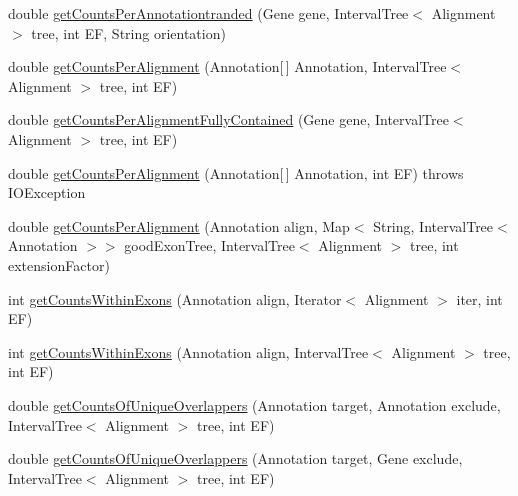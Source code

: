 \begin{DoxyCompactItemize}
\item 
double \hyperlink{interfacebroad_1_1pda_1_1seq_1_1segmentation_1_1_alignment_data_model_a0be22f281d5cabb81da650083813ea30}{get\+Counts\+Per\+Annotationtranded} (Gene gene, Interval\+Tree$<$ Alignment $>$ tree, int E\+F, String orientation)
\item 
double \hyperlink{interfacebroad_1_1pda_1_1seq_1_1segmentation_1_1_alignment_data_model_a1ed3987feec4f07f1756246be69c817f}{get\+Counts\+Per\+Alignment} (Annotation\mbox{[}$\,$\mbox{]} Annotation, Interval\+Tree$<$ Alignment $>$ tree, int E\+F)
\item 
double \hyperlink{interfacebroad_1_1pda_1_1seq_1_1segmentation_1_1_alignment_data_model_a0f1acb29be16a343f4beb4498a7a2970}{get\+Counts\+Per\+Alignment\+Fully\+Contained} (Gene gene, Interval\+Tree$<$ Alignment $>$ tree, int E\+F)
\item 
double \hyperlink{interfacebroad_1_1pda_1_1seq_1_1segmentation_1_1_alignment_data_model_a47c1739c5a1162425af01aab7ab54bc6}{get\+Counts\+Per\+Alignment} (Annotation\mbox{[}$\,$\mbox{]} Annotation, int E\+F)  throws I\+O\+Exception
\item 
double \hyperlink{interfacebroad_1_1pda_1_1seq_1_1segmentation_1_1_alignment_data_model_a8424da04910f86159b5fd43d179958fd}{get\+Counts\+Per\+Alignment} (Annotation align, Map$<$ String, Interval\+Tree$<$ Annotation $>$$>$ good\+Exon\+Tree, Interval\+Tree$<$ Alignment $>$ tree, int extension\+Factor)
\item 
int \hyperlink{interfacebroad_1_1pda_1_1seq_1_1segmentation_1_1_alignment_data_model_a700536b90c78342c4ce1f949155b1823}{get\+Counts\+Within\+Exons} (Annotation align, Iterator$<$ Alignment $>$ iter, int E\+F)
\item 
int \hyperlink{interfacebroad_1_1pda_1_1seq_1_1segmentation_1_1_alignment_data_model_ab0a5c2d73587373baa0ed368afef0f39}{get\+Counts\+Within\+Exons} (Annotation align, Interval\+Tree$<$ Alignment $>$ tree, int E\+F)
\item 
double \hyperlink{interfacebroad_1_1pda_1_1seq_1_1segmentation_1_1_alignment_data_model_af4fb78bc4dc32a83dfe3e25dbc0d7143}{get\+Counts\+Of\+Unique\+Overlappers} (Annotation target, Annotation exclude, Interval\+Tree$<$ Alignment $>$ tree, int E\+F)
\item 
double \hyperlink{interfacebroad_1_1pda_1_1seq_1_1segmentation_1_1_alignment_data_model_a97df3b3d58280b6a14b2b4f46645247a}{get\+Counts\+Of\+Unique\+Overlappers} (Annotation target, Gene exclude, Interval\+Tree$<$ Alignment $>$ tree, int E\+F)
\item 
$$
\end{DoxyCompactItemize}
